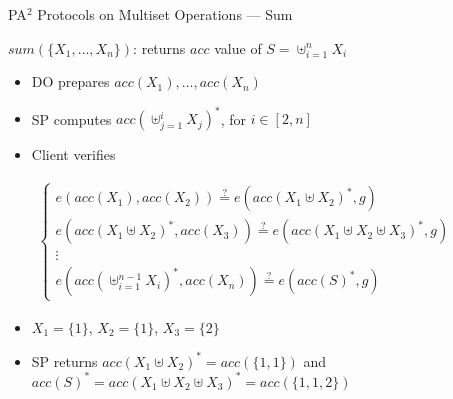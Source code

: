 \documentclass[xcolor={dvipsnames},aspectratio=169,10pt]{beamer}
\begin{document}
\begin{frame}{PA$^2$ Protocols on Multiset Operations --- Sum}
  \begin{block}{$sum(\{X_1, \dotsc, X_n\})$: returns $acc$ value of $S = \uplus_{i=1}^n X_i$}
    \begin{itemize}
      \item DO prepares $acc(X_1), \dotsc, acc(X_n)$
      \item SP computes ${acc(\uplus_{j = 1}^i X_j)}^*$, for $i \in [2, n]$
      \item Client verifies
        \begin{adjustbox}{valign=t}
          \(
          \begin{aligned}
            \left \{
              \begin{array}{l}
                e(acc(X_1), acc(X_2)) \stackrel{?}{=} e({acc(X_1 \uplus X_2)}^*, g)\\
                e({acc(X_1\uplus X_2)}^*, acc(X_3)) \stackrel{?}{=} e({acc(X_1\uplus X_2\uplus X_3)}^*, g) \\
                \vdots\\
                e({acc(\uplus_{i=1}^{n-1} X_i)}^*, acc(X_n)) \stackrel{?}{=} e({acc(S)}^*, g)
              \end{array}
            \right.
          \end{aligned}
          \)
        \end{adjustbox}
    \end{itemize}
  \end{block}
  \begin{example}
    \begin{itemize}
      \item $X_1 = \{ 1 \}$, $X_2 = \{ 1 \}$, $X_3 = \{ 2 \}$
      \item SP returns ${acc(X_1 \uplus X_2)}^* = acc(\{1, 1\})$ and ${acc(S)}^* = {acc(X_1 \uplus X_2 \uplus X_3)}^* = acc(\{1, 1, 2\})$
    \end{itemize}
  \end{example}
\end{frame}
\end{document}
